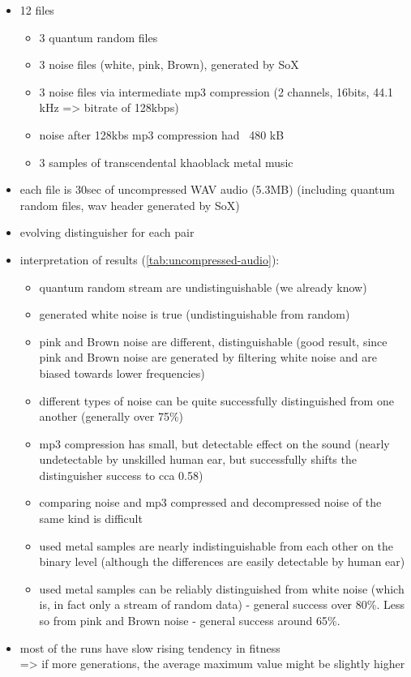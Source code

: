 \documentclass[12pt,oneside]{fithesis2}
\begin{document}
\begin{itemize}
\item 12 files
\begin{itemize}
\item 3 quantum random files
\item 3 noise files (white, pink, Brown), generated by SoX
\item 3 noise files via intermediate mp3 compression (2 channels, 16bits, 44.1 kHz => bitrate of 128kbps)
\item noise after 128kbs mp3 compression had ~480 kB
\item 3 samples of transcendental khaoblack metal music
\end{itemize}
\item each file is 30sec of uncompressed WAV audio (5.3MB) (including quantum random files, wav header generated by SoX)
\item evolving distinguisher for each pair
\item interpretation of results (\autoref{tab:uncompressed-audio}):
\begin{itemize}
\item quantum random stream are undistinguishable (we already know)
\item generated white noise is true (undistinguishable from random)
\item pink and Brown noise are different, distinguishable (good result, since pink and Brown noise are generated by filtering white noise and are biased towards lower frequencies)
\item different types of noise can be quite successfully distinguished from one another (generally over 75\%)
\item mp3 compression has small, but detectable effect on the sound (nearly undetectable by unskilled human ear, but successfully shifts the distinguisher success to cca 0.58)
\item comparing noise and mp3 compressed and decompressed noise of the same kind is difficult
\item used metal samples are nearly indistinguishable from each other on the binary level (although the differences are easily detectable by human ear)
\item used metal samples can be reliably distinguished from white noise (which is, in fact only a stream of random data) - general success over 80\%. Less so from pink and Brown noise - general success around 65\%.
\end{itemize}
\item most of the runs have slow rising tendency in fitness \\ => if more generations, the average maximum value might be slightly higher
\end{itemize}
\end{document}
